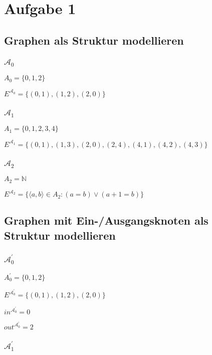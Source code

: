 \section*{Aufgabe 1}


\subsection*{Graphen als Struktur modellieren}


\subsubsection*{$\mathcal{A}_0$}
$A_0 = \{0,1,2\}$

$E^{\mathcal{A}_0} = \{(0,1),(1,2),(2,0)\}$

\subsubsection*{$\mathcal{A}_1$}

$A_1 = \{0,1,2,3,4\}$

$E^{\mathcal{A}_1} = \{(0,1),(1,3),(2,0),(2,4),(4,1),(4,2),(4,3)\}$

\subsubsection*{$\mathcal{A}_2$}

$A_2 = \mathbb{N}$

$E^{\mathcal{A}_2} = \{\langle a,b\rangle \in A_2 : (a = b) \vee (a + 1 = b)\} $



\subsection*{Graphen mit Ein-/Ausgangsknoten als Struktur modellieren}



\subsubsection*{$\mathcal{A}_0^\prime$}
$A_0	^\prime = \{0,1,2\}$

$E^{\mathcal{A}_0^\prime} = \{(0,1),(1,2),(2,0)\}$

$in^{\mathcal{A}_0^\prime} = 0$

$out^{\mathcal{A}_0^\prime} = 2$

\subsubsection*{$\mathcal{A}_1^\prime$}

